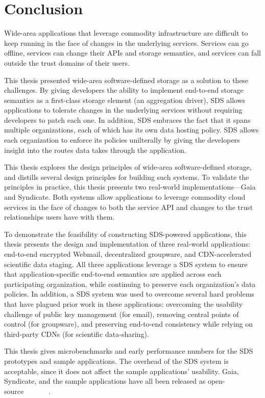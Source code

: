 \chapter{Conclusion}
\label{chap:conclusion}

Wide-area applications that leverage commodity infrastructure are difficult to
keep running in the face of changes in the underlying services.  Services can go
offline, services can change their APIs and storage semantics, and services can
fall outside the trust domains of their users.

This thesis presented wide-area software-defined storage as a solution to these
challenges.  By giving developers the ability to implement end-to-end
storage semantics as a first-class
storage element (an aggregation driver),
SDS allows applications to tolerate changes in the underlying
services without requiring developers to patch each one.
In addition, SDS embraces the fact that it spans multiple organizations, each of
which has its own data hosting policy.  SDS allows each organization to enforce
its policies unilterally by giving the developers insight into the routes data
takes through the application.

This thesis explores the design principles of wide-area software-defined storage, and
distills several design principles for building such systems.  To validate the
principles in practice, this thesis presents two real-world
implementations---Gaia and Syndicate.  Both systems allow applications to
leverage commodity cloud services in the face of changes to both the service API
and changes to the trust relationships users have with them.

To demonstrate the feasibility of constructing SDS-powered applications, 
this thesis presents the design and implementation of three real-world applications:
end-to-end encrypted Webmail, decentralized groupware, and CDN-accelerated
scientific data staging.  All three applications leverage a SDS system to ensure
that application-specific end-to-end semantics are applied across each
participating organization, while continuing to preserve each organization's
data policies.  In addition, a SDS system was used to overcome several hard
problems that have plagued prior work in these applications:
overcoming the usability challenge of public key management (for email),
removing central points of control (for groupware), and preserving end-to-end
consistency while relying on third-party CDNs (for scientific data-sharing).

This thesis gives microbenchmarks and early performance numbers for the SDS prototypes and
sample applications.  The overhead of the SDS system is acceptable,
since it does not affect the sample applications' usability.
Gaia, Syndicate, and the sample applications have all been released as
open-source~\cite{blockstack-core}~\cite{syndicate-storage}~\cite{syndicatemail}~\cite{todo-list}~\cite{blockstack-browser}~\cite{syndicate-sdm}~\cite{syndicate-containers}.

